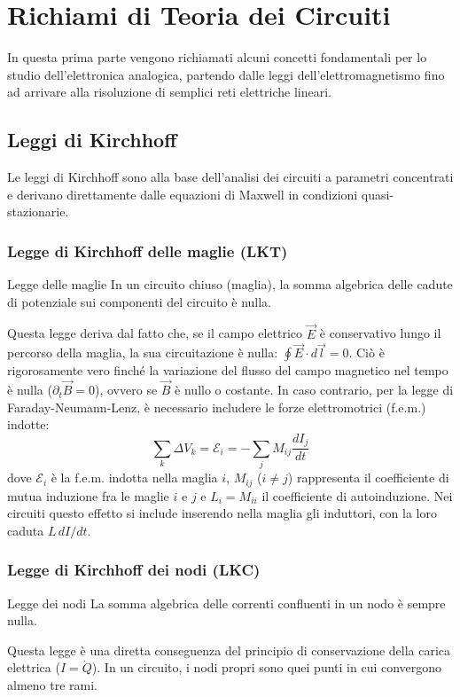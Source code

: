 \chapter{Richiami di Teoria dei Circuiti}
\label{ch:richiami}

In questa prima parte vengono richiamati alcuni concetti fondamentali per lo studio dell'elettronica analogica, partendo dalle leggi dell'elettromagnetismo fino ad arrivare alla risoluzione di semplici reti elettriche lineari.

\section{Leggi di Kirchhoff}
Le leggi di Kirchhoff sono alla base dell'analisi dei circuiti a parametri concentrati e derivano direttamente dalle equazioni di Maxwell in condizioni quasi-stazionarie.

\subsection*{Legge di Kirchhoff delle maglie (LKT)}
\begin{teorema}{Legge delle maglie}
In un circuito chiuso (maglia), la somma algebrica delle cadute di potenziale sui componenti del circuito è nulla.
\end{teorema}
Questa legge deriva dal fatto che, se il campo elettrico $\vec{E}$ è conservativo lungo il percorso della maglia, la sua circuitazione è nulla: $\oint \vec{E} \cdot d\vec{l} = 0$.
Ciò è rigorosamente vero finché la variazione del flusso del campo magnetico nel tempo è nulla ($\partial_t \vec{B} = 0$), ovvero se $\vec{B}$ è nullo o costante. In caso contrario, per la legge di Faraday-Neumann-Lenz, è necessario includere le forze elettromotrici (f.e.m.) indotte:
$$ \sum_k \Delta V_k = \mathcal{E}_i = -\sum_j M_{ij} \frac{dI_j}{dt} $$
dove $\mathcal{E}_i$ è la f.e.m. indotta nella maglia $i$, $M_{ij}$ ($i \neq j$) rappresenta il coefficiente di mutua induzione fra le maglie $i$ e $j$ e $L_i = M_{ii}$ il coefficiente di autoinduzione. Nei circuiti questo effetto si include inserendo nella maglia gli induttori, con la loro caduta $L\,dI/dt$.

\subsection*{Legge di Kirchhoff dei nodi (LKC)}
\begin{teorema}{Legge dei nodi}
La somma algebrica delle correnti confluenti in un nodo è sempre nulla.
\end{teorema}
Questa legge è una diretta conseguenza del principio di conservazione della carica elettrica ($I = \dot{Q}$). In un circuito, i nodi propri sono quei punti in cui convergono almeno tre rami.

